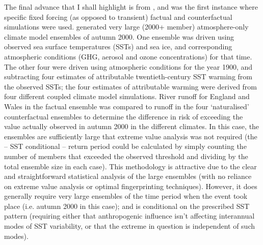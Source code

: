     The final advance that I shall highlight is from \citet{pall_anthropogenic_2011}, and was the first instance where specific fixed forcing (as opposed to transient) factual and counterfactual simulations were used. \citeauthor{pall_anthropogenic_2011} generated very large (2000+ member) atmosphere-only climate model ensembles of autumn 2000. One ensemble was driven using observed sea surface temperatures (SSTs) and sea ice, and corresponding atmospheric conditions (GHG, aerosol and ozone concentrations) for that time. The other four were driven using atmospheric conditions for the year 1900, and subtracting four estimates of attributable twentieth-century SST warming from the observed SSTs; the four estimates of attributable warming were derived from four different coupled climate model simulations. River runoff for England and Wales in the factual ensemble was compared to runoff in the four `naturalised' counterfactual ensembles to determine the difference in risk of exceeding the value actually observed in autumn 2000 in the different climates. In this case, the ensembles are sufficiently large that extreme value analysis was not required (the -- SST conditional -- return period could be calculated by simply counting the number of members that exceeded the observed threshold and dividing by the total ensemble size in each case). This methodology is attractive due to the clear and straightforward statistical analysis of the large ensembles (with no reliance on extreme value analysis or optimal fingerprinting techniques). However, it does generally require very large ensembles of the time period when the event took place (i.e. autumn 2000 in this case); and is conditional on the prescribed SST pattern (requiring either that anthropogenic influence isn't affecting interannual modes of SST variability, or that the extreme in question is independent of such modes).

